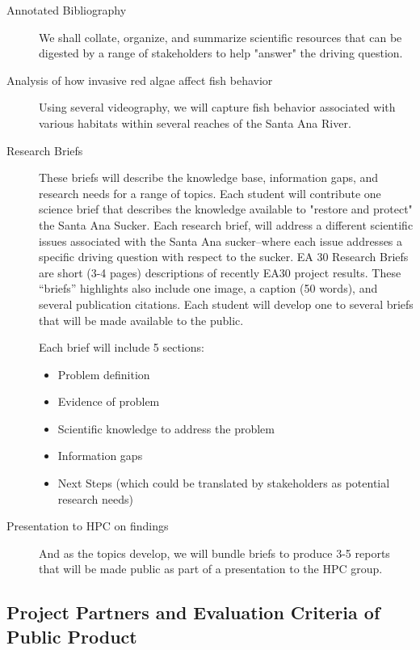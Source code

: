 \documentclass{tufte-handout}\usepackage[]{graphicx}\usepackage[]{color}
\begin{document}
\begin{description}
  \item[Annotated Bibliography] We shall collate, organize, and summarize scientific resources that can be digested by a range of stakeholders to help "answer" the driving question. 
  \item[Analysis of how invasive red algae affect fish behavior] Using several videography, we will capture fish behavior associated with various habitats within several reaches of the Santa Ana River.
  \item[Research Briefs] These briefs will describe the knowledge base, information gaps, and research needs for a range of topics. Each student will contribute one science brief that describes the knowledge available to "restore and protect" the Santa Ana Sucker. Each research brief, will address a different scientific issues associated with the Santa Ana sucker--where each issue addresses a specific driving question with respect to the sucker. EA 30 Research Briefs are short (3-4 pages) descriptions of recently EA30 project results. These ``briefs'' highlights also include one image, a caption (50 words), and several publication citations. Each student will develop one to several briefs that will be made available to the public.
  
Each brief will include 5 sections:

\begin{itemize}
  \item Problem definition
  \item Evidence of problem
  \item Scientific knowledge to address the problem
  \item Information gaps
  \item Next Steps (which could be translated by stakeholders as potential research needs)
\end{itemize}

  \item[Presentation to HPC on findings] And as the topics develop, we will bundle briefs to produce 3-5 reports that will be made public as part of a presentation to the HPC group.
\end{description}

\subsection{Project Partners and Evaluation Criteria of Public Product}
\end{document}
